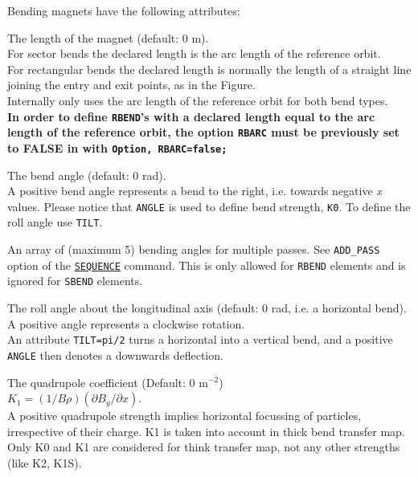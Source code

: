 Bending magnets have the following attributes:
\begin{madlist}
    The length of the magnet (default: 0 m). \\
   For sector bends the declared length is the arc length
   of the reference orbit. \\
   For rectangular bends the declared length is normally the length of a
   straight line joining the entry and exit points, as in the
   Figure. \\
   Internally \madx only uses the arc length of the reference orbit for
   both bend types.\\
   \textbf{In order to define \texttt{RBEND}'s with a declared length equal to the
     arc length of the reference orbit, the option \texttt{RBARC} must be
     previously set to FALSE in \madx with \texttt{Option, RBARC=false;}}

    The bend angle (default: 0 rad). \\
   A positive bend angle represents a bend to the right, i.e. towards
   negative \textit{x} values. Please notice that \texttt{ANGLE} is used to
   define bend strength, \texttt{K0}. To define the roll angle use \texttt{TILT}.

    An array of (maximum 5) bending angles for
   multiple passes. See \texttt{ADD\_PASS} option of the
   \hyperref[chap:sequence]{\texttt{SEQUENCE}} command. This is only
   allowed for \texttt{RBEND} elements and is ignored for \texttt{SBEND}
   elements.

    The roll angle about the longitudinal axis (default: 0
   rad, i.e. a horizontal bend). \\
   A positive angle represents a clockwise rotation. \\
   An attribute \texttt{TILT=pi/2} turns a horizontal into a vertical
   bend, and a positive \texttt{ANGLE} then denotes a downwards
   deflection.

    The quadrupole coefficient (Default: 0 m$^{-2}$)\\
     $K_1 = (1/B\rho) (\partial B_y / \partial x)$. \\
   A positive quadrupole strength implies horizontal focussing of particles,
   irrespective of their charge. K1 is taken into account in thick bend transfer map.
   Only K0 and K1 are considered for think transfer map, not any other strengths (like K2, K1S).


\end{madlist}
